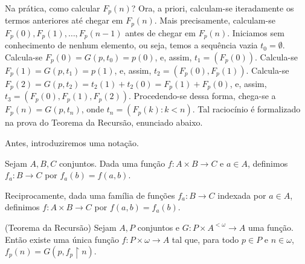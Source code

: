 Na prática, como calcular $F_p(n)$?
Ora, a priori, calculam-se iteradamente os termos anteriores até chegar em $F_p(n)$.
Mais precisamente, calculam-se $F_p(0), F_p(1), \dots, F_p(n-1)$ antes de chegar em $F_p(n)$.
Iniciamos sem conhecimento de nenhum elemento, ou seja, temos a sequência vazia $t_0=\emptyset$.
Calcula-se $F_p(0)=G(p, t_0)=p(0)$, e, assim, $t_1=(F_p(0))$.
Calcula-se $F_p(1)=G(p, t_1)=p(1)$, e, assim, $t_2=(F_p(0), F_p(1))$.
Calcula-se $F_p(2)=G(p, t_2)=t_2(1)+t_2(0)=F_p(1)+F_p(0)$, e, assim, $t_3=(F_p(0), F_p(1), F_p(2))$.
Procedendo-se dessa forma, chega-se a $F_p(n)=G(p, t_n)$, onde $t_n=(F_p(k): k<n)$.
Tal raciocínio é formalizado na prova do Teorema da Recursão, enunciado abaixo.

Antes, introduziremos uma notação.

\begin{definition}[$Z^-$]\label{def:familiasDeFuncoesParametrizadas}
    Sejam $A, B, C$ conjuntos.
    Dada uma função $f: A\times B\to C$ e $a\in A$, definimos $f_a: B\to C$ por $f_a(b)=f(a, b)$.

    Reciprocamente, dada uma família de funções $f_a: B\to C$ indexada por $a\in A$, definimos $f: A\times B\to C$ por $f(a, b)=f_a(b)$.
\end{definition}

\begin{theorem}[$Z^-$](Teorema da Recursão)\label{thm:teoremaDaRecursao}
    Sejam $A, P$ conjuntos e $G: P\times A^{<\omega}\to A$ uma função.
    Então existe uma única função $f:P\times \omega\to A$ tal que, para todo $p \in P$ e $n\in \omega$, $f_p(n)=G(p, f_p\restriction n)$.
\end{theorem}

